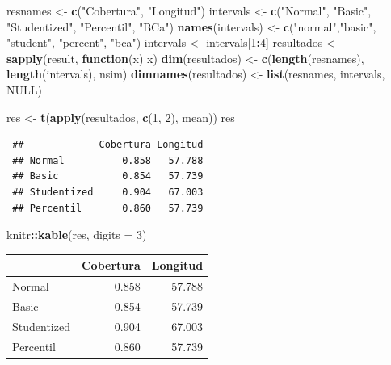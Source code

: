 \documentclass[
  spanish,
  10pt,
]{book}
\newenvironment{Shaded}{\begin{snugshade}}{\end{snugshade}}
\newcommand{\AttributeTok}[1]{\textcolor[rgb]{0.13,0.29,0.53}{#1}}
\newcommand{\ConstantTok}[1]{\textcolor[rgb]{0.56,0.35,0.01}{#1}}
\newcommand{\ControlFlowTok}[1]{\textcolor[rgb]{0.13,0.29,0.53}{\textbf{#1}}}
\newcommand{\DecValTok}[1]{\textcolor[rgb]{0.00,0.00,0.81}{#1}}
\newcommand{\FunctionTok}[1]{\textcolor[rgb]{0.13,0.29,0.53}{\textbf{#1}}}
\newcommand{\NormalTok}[1]{#1}
\newcommand{\OtherTok}[1]{\textcolor[rgb]{0.56,0.35,0.01}{#1}}
\newcommand{\SpecialCharTok}[1]{\textcolor[rgb]{0.81,0.36,0.00}{\textbf{#1}}}
\newcommand{\StringTok}[1]{\textcolor[rgb]{0.31,0.60,0.02}{#1}}
\theoremstyle{break}
\theoremstyle{nonumberplain}
\begin{document}
\begin{Shaded}
\begin{Highlighting}[]
\NormalTok{resnames }\OtherTok{\textless{}{-}} \FunctionTok{c}\NormalTok{(}\StringTok{"Cobertura"}\NormalTok{, }\StringTok{"Longitud"}\NormalTok{)}
\NormalTok{intervals }\OtherTok{\textless{}{-}} \FunctionTok{c}\NormalTok{(}\StringTok{"Normal"}\NormalTok{, }\StringTok{"Basic"}\NormalTok{, }\StringTok{"Studentized"}\NormalTok{, }\StringTok{"Percentil"}\NormalTok{, }\StringTok{"BCa"}\NormalTok{)}
\FunctionTok{names}\NormalTok{(intervals) }\OtherTok{\textless{}{-}} \FunctionTok{c}\NormalTok{(}\StringTok{"normal"}\NormalTok{,}\StringTok{"basic"}\NormalTok{, }\StringTok{"student"}\NormalTok{, }\StringTok{"percent"}\NormalTok{, }\StringTok{"bca"}\NormalTok{)}
\NormalTok{intervals }\OtherTok{\textless{}{-}}\NormalTok{ intervals[}\DecValTok{1}\SpecialCharTok{:}\DecValTok{4}\NormalTok{]}
\NormalTok{resultados }\OtherTok{\textless{}{-}} \FunctionTok{sapply}\NormalTok{(result, }\ControlFlowTok{function}\NormalTok{(x) x)}
\FunctionTok{dim}\NormalTok{(resultados) }\OtherTok{\textless{}{-}} \FunctionTok{c}\NormalTok{(}\FunctionTok{length}\NormalTok{(resnames), }\FunctionTok{length}\NormalTok{(intervals), nsim)}
\FunctionTok{dimnames}\NormalTok{(resultados) }\OtherTok{\textless{}{-}} \FunctionTok{list}\NormalTok{(resnames, intervals, }\ConstantTok{NULL}\NormalTok{)}

\NormalTok{res }\OtherTok{\textless{}{-}} \FunctionTok{t}\NormalTok{(}\FunctionTok{apply}\NormalTok{(resultados, }\FunctionTok{c}\NormalTok{(}\DecValTok{1}\NormalTok{, }\DecValTok{2}\NormalTok{), mean))}
\NormalTok{res}
\end{Highlighting}
\end{Shaded}

\begin{verbatim}
 ##             Cobertura Longitud
 ## Normal          0.858   57.788
 ## Basic           0.854   57.739
 ## Studentized     0.904   67.003
 ## Percentil       0.860   57.739
\end{verbatim}

\begin{Shaded}
\begin{Highlighting}[]
\NormalTok{knitr}\SpecialCharTok{::}\FunctionTok{kable}\NormalTok{(res, }\AttributeTok{digits =} \DecValTok{3}\NormalTok{)}
\end{Highlighting}
\end{Shaded}

\begin{tabular}{l|r|r}
\hline
  & Cobertura & Longitud\\
\hline
Normal & 0.858 & 57.788\\
\hline
Basic & 0.854 & 57.739\\
\hline
Studentized & 0.904 & 67.003\\
\hline
Percentil & 0.860 & 57.739\\
\hline
\end{tabular}
\end{document}
